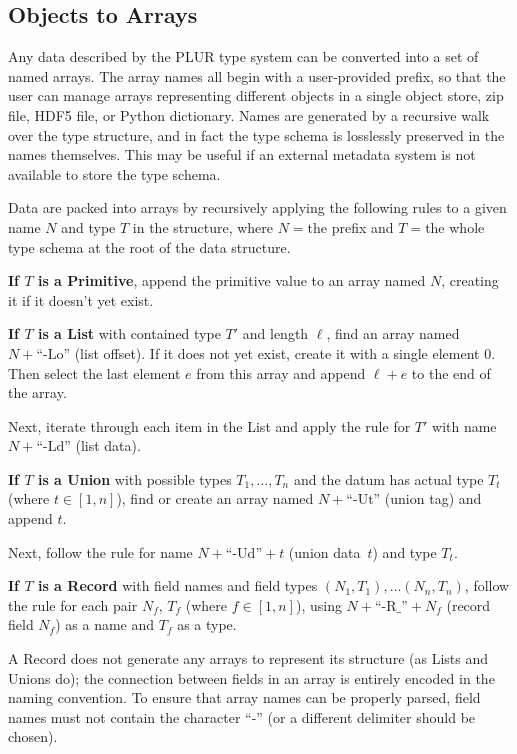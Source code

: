 \documentclass[10pt, conference, compsocconf]{IEEEtran}
\begin{document}
\subsection{Objects to Arrays}

Any data described by the PLUR type system can be converted into a set of named arrays. The array names all begin with a user-provided prefix, so that the user can manage arrays representing different objects in a single object store, zip file, HDF5 file, or Python dictionary. Names are generated by a recursive walk over the type structure, and in fact the type schema is losslessly preserved in the names themselves. This may be useful if an external metadata system is not available to store the type schema.

Data are packed into arrays by recursively applying the following rules to a given name $N$ and type $T$ in the structure, where $N = \mbox{the}$ prefix and $T = \mbox{the}$ whole type schema at the root of the data structure.

{\bf If $T$ is a Primitive}, append the primitive value to an array named $N$, creating it if it doesn't yet exist.

{\bf If $T$ is a List} with contained type $T'$ and length $\ell$, find an array named $N + \mbox{``-Lo''}$ (list offset). If it does not yet exist, create it with a single element $0$. Then select the last element $e$ from this array and append $\ell + e$ to the end of the array.

Next, iterate through each item in the List and apply the rule for $T'$ with name $N + \mbox{``-Ld''}$ (list data).

{\bf If $T$ is a Union} with possible types $T_1, \ldots, T_n$ and the datum has actual type $T_t$ (where $t \in [1, n]$), find or create an array named $N + \mbox{``-Ut''}$ (union tag) and append $t$.

Next, follow the rule for name $N + \mbox{``-Ud''} + t$ (union data~$t$) and type $T_t$.

{\bf If $T$ is a Record} with field names and field types $(N_1, T_1), \ldots (N_n, T_n)$, follow the rule for each pair $N_f$, $T_f$ (where $f \in [1, n]$), using $N + \mbox{``-R\_''} + N_f$ (record field $N_f$) as a name and $T_f$ as a type.

A Record does not generate any arrays to represent its structure (as Lists and Unions do); the connection between fields in an array is entirely encoded in the naming convention. To ensure that array names can be properly parsed, field names must not contain the character ``-'' (or a different delimiter should be chosen).
\end{document}
